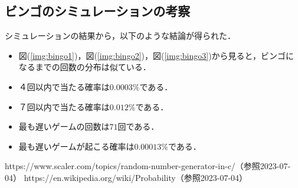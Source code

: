 \documentclass[a4j, titlepage]{jarticle}
\begin{document}
      \subsection{ビンゴのシミュレーションの考察}
      シミュレーションの結果から，以下のような結論が得られた．
      \begin{screen}
        \begin{itemize}
          \item 図(\ref{img:bingo1})，図(\ref{img:bingo2})，図(\ref{img:bingo3})から見ると，ビンゴになるまでの回数の分布は似ている．
          \item ４回以内で当たる確率は$0.0003\%$である．
          \item ７回以内で当たる確率は$0.012\%$である．
          \item 最も遅いゲームの回数は$71$回である．
          \item 最も遅いゲームが起こる確率は$0.00013\%$である．
        \end{itemize}
      \end{screen}


    \begin{thebibliography}{99}
      https://www.scaler.com/topics/random-number-generator-in-c/（参照2023-07-04）
      https://en.wikipedia.org/wiki/Probability（参照2023-07-04）
    \end{thebibliography}
\end{document}
